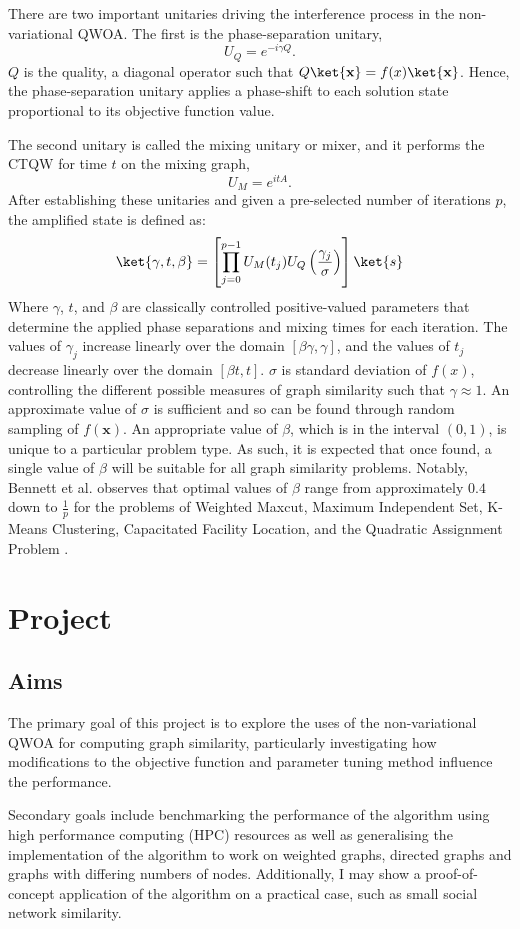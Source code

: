 There are two important unitaries driving the interference process in the non-variational QWOA. The first is the phase-separation unitary,
$$
U_{Q}=e^{-i\gamma Q}.
$$
$Q$ is the quality, a diagonal operator such that $Q\ket{\mathbf{x}}=f(x)\ket{\mathbf{x}}$. Hence, the phase-separation unitary applies a phase-shift to each solution state proportional to its objective function value. 

The second unitary is called the mixing unitary or mixer, and it performs the CTQW for time $t$ on the mixing graph,
$$
U_{M}= e^{itA}.
$$
After establishing these unitaries and given a pre-selected number of iterations $p$, the amplified state is defined as:
$$
\ket{\gamma,t,\beta}=\left[\prod_{j=0}^{p-1} U_{M}(t_{j}) U_{Q}\left(\frac{\gamma_{j}}{\sigma} \right) \right] \ket{s}
$$
Where $\gamma$, $t$, and $\beta$ are classically controlled positive-valued parameters that determine the applied phase separations and mixing times for each iteration. The values of $\gamma_{j}$ increase linearly over the domain $[\beta \gamma , \gamma]$, and the values of $t_{j}$ decrease linearly over the domain $[\beta t,t]$. $\sigma$ is standard deviation of $f(x)$, controlling the different possible measures of graph similarity such that $\gamma \approx 1$. An approximate value of $\sigma$ is sufficient and so can be found through random sampling of $f(\mathbf{x})$. An appropriate value of $\beta$, which is in the interval $(0,1)$, is unique to a particular problem type. As such, it is expected that once found, a single value of $\beta$ will be suitable for all graph similarity problems. Notably, Bennett et al. observes that optimal values of $\beta$ range from approximately $0.4$ down to $\frac{1}{p}$ for the problems of Weighted Maxcut, Maximum Independent Set, K-Means Clustering, Capacitated Facility Location, and the Quadratic Assignment Problem \cite{bennett2024nonvariational}.

\section{Project}
\subsection{Aims}
The primary goal of this project is to explore the uses of the non-variational QWOA for computing graph similarity, particularly investigating how modifications to the objective function and parameter tuning method influence the performance.

Secondary goals include benchmarking the performance of the algorithm using high performance computing (HPC) resources as well as generalising the implementation of the algorithm to work on weighted graphs, directed graphs and graphs with differing numbers of nodes. Additionally, I may show a proof-of-concept application of the algorithm on a practical case, such as small social network similarity.


